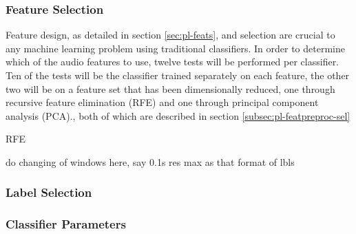         \subsubsection{Feature Selection}
        \label{subsubsec:exp-clf-opt-featsel}
            Feature design, as detailed in section \ref{sec:pl-feats}, and selection are crucial to any machine learning problem using traditional classifiers. In order to determine which of the audio features to use, twelve tests will be performed per classifier. Ten of the tests will be the classifier trained separately on each feature, the other two will be on a feature set that has been dimensionally reduced, one through recursive feature elimination (RFE) and one through principal component analysis (PCA)., both of which are described in section \ref{subsec:pl-featpreproc-sel} 
            
            RFE
            
            do changing of windows here, say 0.1s res max as that format of lbls
    
        \subsubsection{Label Selection}
        \label{subsubsec:exp-clf-opt-label}
            
        \subsubsection{Classifier Parameters}
        \label{subsubsec:exp-clf-opt-param}
     





            
    
